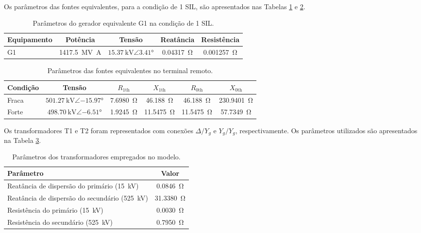 Os parâmetros das fontes equivalentes, para a condição de 1 SIL, são apresentados nas Tabelas \ref{tab:parametros-gerador} e \ref{tab:parametros-fonte-equivalente}.

\begin{table}[H]
  \centering
  \small
  \caption{Parâmetros do gerador equivalente G1 na condição de 1 SIL.}
  \label{tab:parametros-gerador}
  \begin{tabular}{lcccc}
    \toprule
    Equipamento & Potência & Tensão & Reatância & Resistência \\
    \midrule
    G1 & \SI{1417,5}{\mega\volt\ampere} & $\SI{15,37}{\kilo\volt}\angle \ang{3,41}$ & \SI{0,04317}{\ohm} & \SI{0,001257}{\ohm} \\
    \bottomrule
  \end{tabular}
\end{table}

\begin{table}[H]
  \centering
  \small
  \caption{Parâmetros das fontes equivalentes no terminal remoto.}
  \label{tab:parametros-fonte-equivalente}
  \begin{tabular}{lccccc}
    \toprule
    Condição & Tensão & $R_{1\mathrm{th}}$ & $X_{1\mathrm{th}}$ & $R_{0\mathrm{th}}$ & $X_{0\mathrm{th}}$ \\
    \midrule
    Fraca & $\SI{501,27}{\kilo\volt}\angle \ang{-15,97}$ & \SI{7,6980}{\ohm} & \SI{46,188}{\ohm} & \SI{46,188}{\ohm} & \SI{230,9401}{\ohm} \\
    Forte & $\SI{498,70}{\kilo\volt}\angle \ang{-6,51}$ & \SI{1,9245}{\ohm} & \SI{11,5475}{\ohm} & \SI{11,5475}{\ohm} & \SI{57,7349}{\ohm} \\
    \bottomrule
  \end{tabular}
\end{table}

Os transformadores T1 e T2 foram representados com conexões $\Delta/Y_g$ e $Y_g/Y_g$, respectivamente. Os parâmetros utilizados são apresentados na Tabela \ref{tab:parametros-transformador}.

\begin{table}[H]
  \centering
  \small
  \caption{Parâmetros dos transformadores empregados no modelo.}
  \label{tab:parametros-transformador}
  \begin{tabular}{lc}
    \toprule
    Parâmetro & Valor \\
    \midrule
    Reatância de dispersão do primário (\SI{15}{\kilo\volt}) & \SI{0,0846}{\ohm} \\
    Reatância de dispersão do secundário (\SI{525}{\kilo\volt}) & \SI{31,3380}{\ohm} \\
    Resistência do primário (\SI{15}{\kilo\volt}) & \SI{0,0030}{\ohm} \\
    Resistência do secundário (\SI{525}{\kilo\volt}) & \SI{0,7950}{\ohm} \\
    \bottomrule
  \end{tabular}
\end{table}

